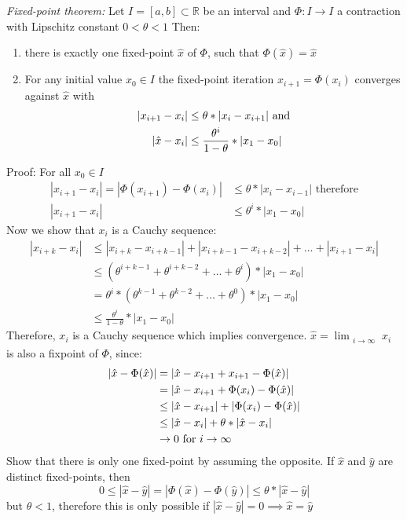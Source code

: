\emph{Fixed-point theorem:} Let $I=[a,b] \subset \mathbb{R}$ be an interval and $\Phi: I \to I$ a contraction with Lipschitz constant $0 < \theta < 1$
Then:
\begin{enumerate}[label=(\roman*)]
    \item there is exactly one fixed-point $\hat{x}$ of $\Phi$, such that $\Phi(\hat{x}) = \hat{x}$
    \item For any initial value $x_0 \in I$ the fixed-point iteration $x_{i+1} = \Phi(x_i)$ converges against $\hat{x}$ with
    \begin{align*}
        |x_{i+1}-x_i| &\leq \theta *|x_i-x_{i+1}|\hbox{ and}\\
        |\hat{x}-x_i| &\leq \frac{\theta^i}{1- \theta} * |x_1-x_0|
    \end{align*}
\end{enumerate}
Proof: For all $x_0 \in I$
\begin{align*}
    |x_{i+1}-x_i|=|\Phi(x_{i+1})-\Phi(x_i)| &\leq  \theta * |x_i-x_{i-1}| \mbox{ therefore}\\
    |x_{i+1}-x_i| &\leq \theta^i*|x_1-x_0|
\end{align*}
Now we show that $x_i$ is a Cauchy sequence:
\begin{align*}
    |x_{i+k}-x_i| &\leq |x_{i+k}-x_{i+k-1}|+|x_{i+k-1}-x_{i+k-2}|+\ldots + |x_{i+1}-x_i|\\
    &\leq (\theta^{i+k-1}+\theta^{i+k-2}+\ldots+\theta^i)* |x_1-x_0|\\
    &= \theta^i*(\theta^{k-1}+\theta^{k-2}+\ldots+\theta^{0})*|x_1-x_0| \\
    &\leq \frac{\theta^i}{1-\theta}* |x_1-x_0|
\end{align*}
Therefore, $x_i$ is a Cauchy sequence which implies convergence. $\hat{x} = \lim_{\substack{i \to \infty}}x_i$ is also a fixpoint of $\Phi$, since:
\begin{align*}
    |\hat{x} - \Phi(\hat{x})|&=|\hat{x}-x_{i+1}+x_{i+1}-\Phi(\hat{x})|\\
    & = |\hat{x}-x_{i+1}+\Phi(x_i)-\Phi(\hat{x})|\\
    & \leq |\hat{x}-x_{i+1}| + |\Phi(x_i)-\Phi(\hat{x})|\\
    &  \leq |\hat{x}-x_i|+ \theta * |\hat{x}-x_i|\\
    &\to 0  \hbox{ for } i \to \infty
\end{align*}
Show that there is only one fixed-point by assuming the opposite.
If $\hat{x}$ and $\hat{y}$ are distinct fixed-points, then
\begin{equation*}
    0 \leq |\hat{x}-\hat{y}| = |\Phi(\hat{x})-\Phi(\hat{y})| \leq \theta * |\hat{x}-\hat{y}|
\end{equation*}
but $\theta < 1$, therefore this is only possible if $|\hat{x}- \hat{y}| = 0 \implies \hat{x} = \hat{y}$


